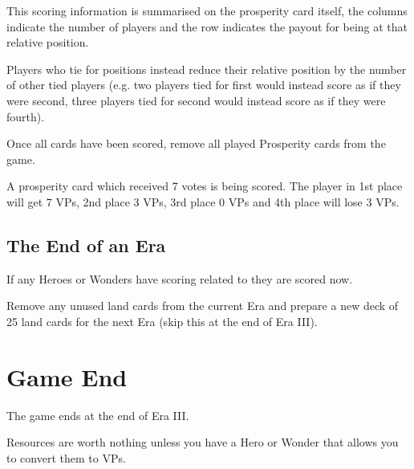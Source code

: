 \documentclass[10pt,twocolumn]{article}
\begin{document}
This scoring information is summarised on the prosperity card itself, the columns indicate the number of players and the row indicates the payout for being at that relative position.

Players who tie for positions instead reduce their relative position by the number of other tied players (e.g. two players tied for first would instead score as if they were second, three players tied for second would instead score as if they were fourth).

Once all cards have been scored, remove all played Prosperity cards from the game.

\begin{BoxExample}A prosperity card which received 7 votes is being scored. The player in 1st place will get 7 VPs, 2nd place 3 VPs, 3rd place 0 VPs and 4th place will lose 3 VPs.\end{BoxExample}

\subsection{The End of an Era}
If any Heroes or Wonders have scoring related to  they are scored now.

Remove any unused land cards from the current Era and prepare a new deck of 25 land cards for the next Era (skip this at the end of Era III).

\section{Game End}
The game ends at the end of Era III.

Resources are worth nothing unless you have a Hero or Wonder that allows you to convert them to VPs.
\end{document}
